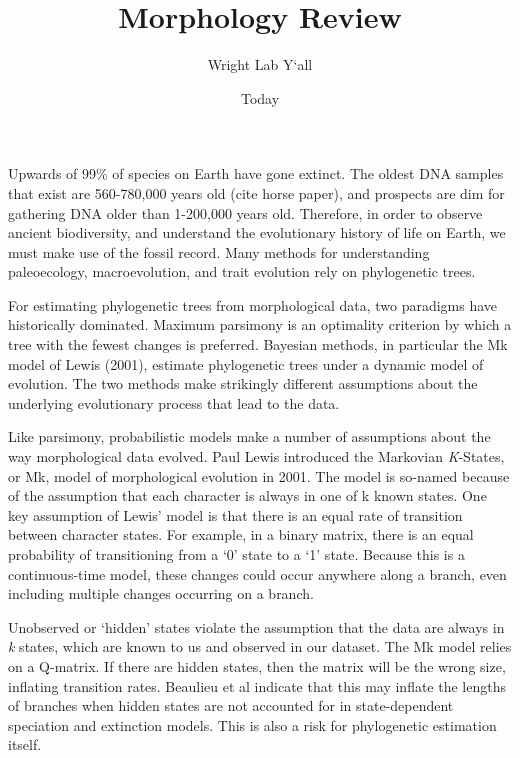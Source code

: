 \documentclass[]{article}
\begin{document}
\title{Morphology Review}
\author{Wright Lab Y`all}
\date{Today}
\maketitle


Upwards of 99\% of species on Earth have gone extinct.
 The oldest DNA samples that exist are 560-780,000 years old (cite horse paper), and prospects are dim for gathering DNA older than 1-200,000 years old. 
 Therefore, in order to observe ancient biodiversity, and understand the evolutionary history of life on Earth, we must make use of the fossil record. 
 Many methods for understanding paleoecology, macroevolution, and trait evolution rely on phylogenetic trees. \par

For estimating phylogenetic trees from morphological data, two paradigms have historically dominated. Maximum parsimony is an optimality criterion by which a tree with the fewest changes is preferred. 
Bayesian methods, in particular the Mk model of Lewis (2001), estimate phylogenetic trees under a dynamic model of evolution.
The two methods make strikingly different assumptions about the underlying evolutionary process that lead to the data. \par 



Like parsimony, probabilistic models make a number of assumptions about the way morphological data evolved. 
Paul Lewis introduced the Markovian \textit{K}-States, or Mk, model of morphological evolution in 2001. 
The model is so-named because of the assumption that each character is always in one of {k} known states.
One key assumption of Lewis' model is that there is an equal rate of transition between character states.
For example, in a binary matrix, there is an equal probability of transitioning from a `0' state to a `1' state.
Because this is a continuous-time model, these changes could occur anywhere along a branch, even including multiple changes occurring on a branch.
\par

Unobserved or `hidden' states violate the assumption that the data are always in \textit{k} states, which are known to us and observed in our dataset.
The Mk model relies on a Q-matrix.
If there are hidden states, then the matrix will be the wrong size, inflating transition rates.
Beaulieu et al indicate that this may inflate the lengths of branches when hidden states are not accounted for in state-dependent speciation and extinction models.
This is also a risk for phylogenetic estimation itself. \par
\end{document}
